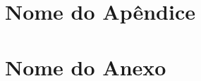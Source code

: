 \documentclass[openright]{normas-utf-tex} %
\begin{document}
		


\clearpage %
\label{bibstart}
\label{bibend}

\apendice
\chapter{Nome do Ap\^endice}

\anexo
\chapter{Nome do Anexo}
\end{document}
